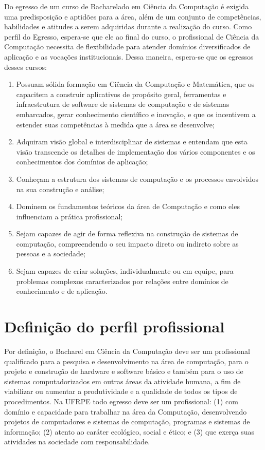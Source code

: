 \documentclass[
	12pt,				%
	openright,			%
  oneside,     %
	a4paper,			%
	chapter=TITLE,		%
	english,			%
	french,				%
	spanish,			%
	brazil				%
	]{abntex2}
\begin{document}
Do egresso de um curso de Bacharelado em Ciência da Computação é exigida uma predisposição e aptidões para a área, além de um conjunto de competências, habilidades e atitudes a serem adquiridas durante a realização do curso. Como perfil do Egresso, espera-se que ele ao final do curso, o profissional de Ciência da Computação necessita de flexibilidade para atender domínios diversificados de aplicação e as vocações institucionais. Dessa maneira, espera-se que os egressos desses cursos:

\begin{enumerate}
    \item Possuam sólida formação em Ciência da Computação e Matemática, que os capacitem a construir aplicativos de propósito geral, ferramentas e infraestrutura de software de sistemas de computação e de sistemas embarcados, gerar conhecimento científico e inovação, e que os incentivem a estender suas competências à medida que a área se desenvolve;
    \item Adquiram visão global e interdisciplinar de sistemas e entendam que esta visão transcende os detalhes de implementação dos vários componentes e os conhecimentos dos domínios de aplicação;
    \item Conheçam a estrutura dos sistemas de computação e os processos envolvidos na sua construção e análise;
    \item Dominem os fundamentos teóricos da área de Computação e como eles influenciam a prática profissional;
    \item Sejam capazes de agir de forma reflexiva na construção de sistemas de computação, compreendendo o seu impacto direto ou indireto sobre as pessoas e a sociedade;
    \item Sejam capazes de criar soluções, individualmente ou em equipe, para problemas complexos caracterizados por relações entre domínios de conhecimento e de aplicação.
\end{enumerate}

\section{Definição do perfil profissional}

Por definição, o Bacharel em Ciência da Computação deve ser um profissional qualificado para a pesquisa e desenvolvimento na área de computação, para o projeto e construção de hardware e software básico e também para o uso de sistemas computadorizados em outras áreas da atividade humana, a fim de viabilizar ou aumentar a produtividade e a qualidade de todos os tipos de procedimentos. Na UFRPE todo egresso deve ser um profissional: (1) com domínio e capacidade para trabalhar na área da Computação, desenvolvendo projetos de computadores e sistemas de computação, programas e sistemas de informação; (2) atento ao caráter ecológico, social e ético; e (3) que exerça suas atividades na sociedade com responsabilidade.
\end{document}
